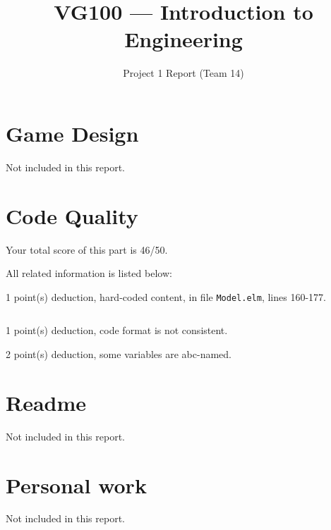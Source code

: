 \documentclass{article}
\title{VG100 --- Introduction to\\ Engineering}
\subtitle{Project 1 Report (Team 14)}
\begin{document}
\maketitle

\section{Game Design}

Not included in this report.

\section{Code Quality}

Your total score of this part is 46/50. \medskip

All related information is listed below: \medskip

1 point(s) {\color{red}deduction}, hard-coded content, in file {\color{blue}\texttt{Model.elm}}, lines {\color{blue}160-177}.

\inputminted[firstline=160,lastline=177]{elm}{Model.elm}

1 point(s) {\color{red}deduction}, code format is not consistent.\medskip

2 point(s) {\color{red}deduction}, some variables are abc-named.\medskip



\newpage

\section{Readme}

Not included in this report.

\section{Personal work}

Not included in this report.


\newpage
\end{document}
